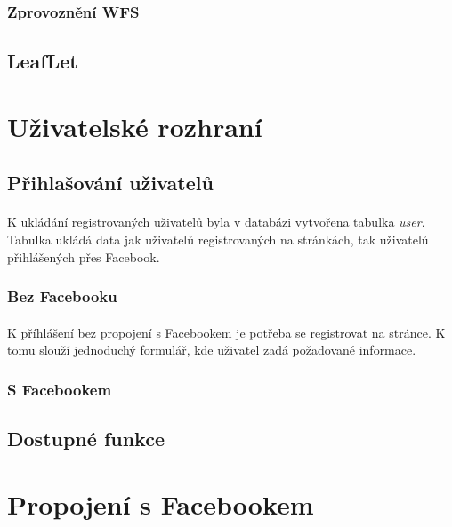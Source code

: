 \documentclass[11pt,a4paper,titlepage,oneside]{book}
\begin{document}
				\subsubsection{Zprovoznění WFS}
			\subsection{LeafLet}

		\section{Uživatelské rozhraní}
			\subsection{Přihlašování uživatelů}
				\paragraph{}K ukládání registrovaných uživatelů byla v databázi vytvořena tabulka \textit{user}. Tabulka ukládá data jak uživatelů registrovaných na stránkách, tak uživatelů přihlášených přes Facebook.
				\subsubsection{Bez Facebooku}
					\paragraph{} K příhlášení bez propojení s Facebookem je potřeba se registrovat na stránce. K tomu slouží jednoduchý formulář, kde uživatel zadá požadované informace.
				\subsubsection{S Facebookem}
					\paragraph{}
			\subsection{Dostupné funkce}
				\paragraph{}

		\section{Propojení s Facebookem}
\end{document}
